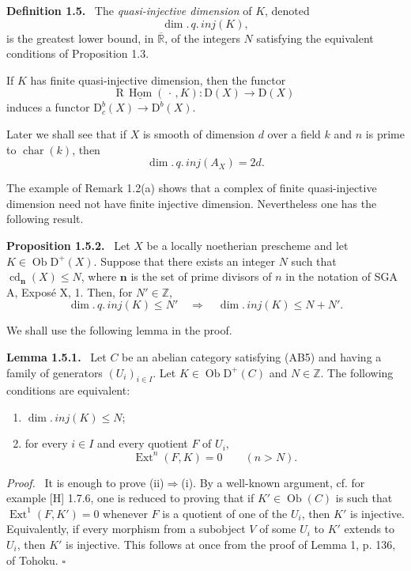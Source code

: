 \documentclass[12pt]{article}
\newcommand{\ZZ}{\mathbb Z}
\newcommand{\RR}{\mathbb R}
\newcommand{\Hom}{\operatorname{Hom}}
\newcommand{\Ext}{\operatorname{Ext}}
\newcommand{\cd}{\operatorname{cd}}
\newcommand{\ob}{\operatorname{Ob}}
\newcommand{\D}{\mathrm D}
\newcommand{\R}{\mathrm R}
\newcommand{\qedtext}{\hfill$\square$}
\newenvironment{statement}[1]{\par\medskip\noindent\textbf{#1.}\ }{\par\medskip}
\newenvironment{prooftext}[1][Proof]{\par\noindent\emph{#1.}\ }{\par\medskip}
\begin{document}
\begin{statement}{Definition 1.5}
The \emph{quasi-injective dimension} of $K$, denoted
\[
   \dim.\,q.\,inj(K),
\]
is the greatest lower bound, in $\overline{\RR}$, of the integers $N$ satisfying the equivalent conditions of Proposition 1.3.
\end{statement}

If $K$ has finite quasi-injective dimension, then the functor
\[
   \R\,\underline{\Hom}(\,\cdot\,,K):\D(X)\longrightarrow\D(X)
\]
induces a functor $\D_c^b(X)\to\D^b(X)$.

Later we shall see that if $X$ is smooth of dimension $d$ over a field $k$ and $n$ is prime to $\operatorname{char}(k)$, then
\[
   \dim.\,q.\,inj(A_X)=2d.
\]

The example of Remark 1.2(a) shows that a complex of finite quasi-injective dimension need not have finite injective dimension. Nevertheless one has the following result.

\begin{statement}{Proposition 1.5.2}
Let $X$ be a locally noetherian prescheme and let $K\in\ob\D^+(X)$. Suppose that there exists an integer $N$ such that $\cd_{\mathbf n}(X)\le N$, where $\mathbf n$ is the set of prime divisors of $n$ in the notation of SGA A, Exposé X, 1. Then, for $N'\in\ZZ$,
\[
   \dim.\,q.\,inj(K)\le N'\quad\Longrightarrow\quad \dim.\,inj(K)\le N+N'.
\]
\end{statement}

We shall use the following lemma in the proof.

\begin{statement}{Lemma 1.5.1}
Let $C$ be an abelian category satisfying (AB5) and having a family of generators $(U_i)_{i\in I}$. Let $K\in\ob\D^+(C)$ and $N\in\ZZ$. The following conditions are equivalent:
\begin{enumerate}[label=(\roman*)]
\item $\dim.\,inj(K)\le N$;
\item for every $i\in I$ and every quotient $F$ of $U_i$,
\[
   \Ext^n(F,K)=0\qquad(n>N).
\]
\end{enumerate}
\end{statement}

\begin{prooftext}
It is enough to prove (ii)$\Rightarrow$(i). By a well-known argument, cf. for example [H] 1.7.6, one is reduced to proving that if $K'\in\ob(C)$ is such that $\Ext^1(F,K')=0$ whenever $F$ is a quotient of one of the $U_i$, then $K'$ is injective. Equivalently, if every morphism from a subobject $V$ of some $U_i$ to $K'$ extends to $U_i$, then $K'$ is injective. This follows at once from the proof of Lemma 1, p. 136, of Tohoku. \qedtext
\end{prooftext}
\end{document}
